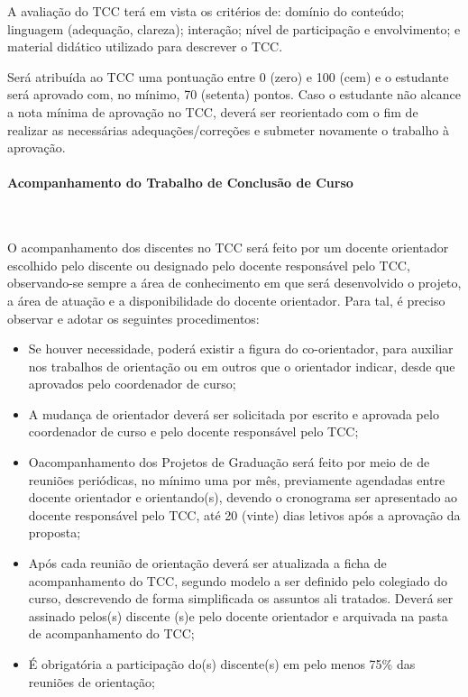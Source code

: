 A avaliação do TCC terá em vista os critérios de: domínio do conteúdo; linguagem (adequação, clareza); interação; nível de participação e envolvimento; e material didático utilizado para descrever o TCC.

Será atribuída ao TCC uma pontuação entre 0 (zero) e 100 (cem) e o estudante será aprovado com, no mínimo, 70 (setenta) pontos. Caso o estudante não alcance a nota mínima de aprovação no TCC, deverá ser reorientado com o fim de realizar as necessárias adequações/correções e submeter novamente o trabalho à aprovação.

\paragraph{Acompanhamento do Trabalho de Conclusão de Curso}\

O acompanhamento dos discentes no TCC será feito por um docente orientador escolhido pelo discente ou designado pelo docente responsável pelo TCC, observando-se sempre a área de conhecimento em que será desenvolvido o projeto, a área de atuação e a disponibilidade do docente orientador. Para tal, é preciso observar e adotar os seguintes procedimentos:

\begin{itemize}
	\item Se houver necessidade, poderá existir a figura do co-orientador, para auxiliar nos trabalhos de orientação ou em outros que o orientador indicar, desde que aprovados pelo coordenador de curso;

	\item A mudança de orientador deverá ser solicitada por escrito e aprovada pelo coordenador de curso e pelo docente responsável pelo TCC;

	 \item Oacompanhamento dos Projetos de Graduação será feito por meio de de reuniões periódicas, no mínimo uma por mês, previamente agendadas entre docente orientador e orientando(s), devendo o cronograma ser apresentado ao docente responsável pelo TCC, até 20 (vinte) dias letivos após a aprovação da proposta;

	 \item Após cada reunião de orientação deverá ser atualizada a ficha de acompanhamento do TCC, segundo modelo a ser definido pelo colegiado do curso, descrevendo de forma simplificada os assuntos ali tratados. Deverá ser assinado pelos(s) discente (s)e pelo docente orientador e arquivada na pasta de acompanhamento do TCC;

	 \item É obrigatória a participação do(s) discente(s) em pelo menos 75\% das reuniões de orientação;
\end{itemize}

